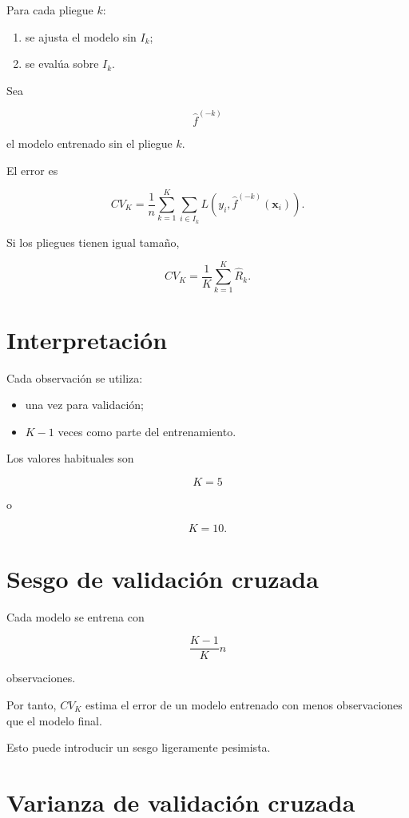 \documentclass[
  spanish,
  11pt,
  letterpaper,
  DIV=11,
  numbers=noendperiod]{scrreprt}
\providecommand{\tightlist}{%
  \setlength{\itemsep}{0pt}\setlength{\parskip}{0pt}}
\theoremstyle{definition}
\theoremstyle{plain}
\theoremstyle{definition}
\theoremstyle{remark}
\begin{document}
Para cada pliegue \(k\):

\begin{enumerate}
\def\labelenumi{\arabic{enumi}.}
\tightlist
\item
  se ajusta el modelo sin \(I_k\);
\item
  se evalúa sobre \(I_k\).
\end{enumerate}

Sea

\[
\widehat{f}^{(-k)}
\]

el modelo entrenado sin el pliegue \(k\).

El error es

\[
CV_K
=
\frac{1}{n}
\sum_{k=1}^{K}
\sum_{i\in I_k}
L
\left(
y_i,
\widehat{f}^{(-k)}(\mathbf{x}_i)
\right).
\]

Si los pliegues tienen igual tamaño,

\[
CV_K
=
\frac{1}{K}
\sum_{k=1}^{K}
\widehat{R}_k.
\]

\section{Interpretación}\label{interpretaciuxf3n}

Cada observación se utiliza:

\begin{itemize}
\tightlist
\item
  una vez para validación;
\item
  \(K-1\) veces como parte del entrenamiento.
\end{itemize}

Los valores habituales son

\[
K=5
\]

o

\[
K=10.
\]

\section{Sesgo de validación
cruzada}\label{sesgo-de-validaciuxf3n-cruzada}

Cada modelo se entrena con

\[
\frac{K-1}{K}n
\]

observaciones.

Por tanto, \(CV_K\) estima el error de un modelo entrenado con menos
observaciones que el modelo final.

Esto puede introducir un sesgo ligeramente pesimista.

\section{Varianza de validación
cruzada}\label{varianza-de-validaciuxf3n-cruzada}
\end{document}
